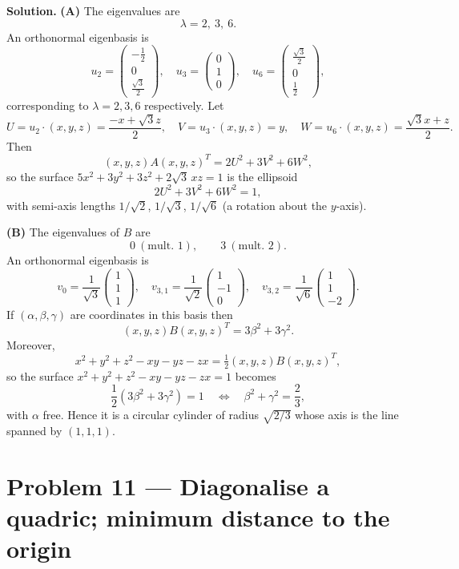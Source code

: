 \documentclass[12pt,a4paper]{article}
\theoremstyle{plain}
\theoremstyle{definition}      %
\begin{document}
\textbf{Solution.}
\textbf{(A)} The eigenvalues are
\[
\lambda=2,\ 3,\ 6.
\]
An orthonormal eigenbasis is
\[
u_{2}=\begin{pmatrix}-\tfrac12\\[2pt]0\\[2pt]\tfrac{\sqrt3}{2}\end{pmatrix},\quad
u_{3}=\begin{pmatrix}0\\[2pt]1\\[2pt]0\end{pmatrix},\quad
u_{6}=\begin{pmatrix}\tfrac{\sqrt3}{2}\\[2pt]0\\[2pt]\tfrac12\end{pmatrix},
\]
corresponding to $\lambda=2,3,6$ respectively.
Let
\[
U=u_2\cdot(x,y,z)=\frac{-x+\sqrt3 z}{2},\quad
V=u_3\cdot(x,y,z)=y,\quad
W=u_6\cdot(x,y,z)=\frac{\sqrt3 x+z}{2}.
\]
Then
\[
(x,y,z)A(x,y,z)^T=2U^2+3V^2+6W^2,
\]
so the surface $5x^2+3y^2+3z^2+2\sqrt3\,xz=1$ is the ellipsoid
\[
2U^2+3V^2+6W^2=1,
\]
with semi-axis lengths $1/\sqrt2$, $1/\sqrt3$, $1/\sqrt6$ (a rotation about the $y$-axis).

\textbf{(B)} The eigenvalues of $B$ are
\[
0\ (\text{mult.\ }1),\qquad 3\ (\text{mult.\ }2).
\]
An orthonormal eigenbasis is
\[
v_0=\frac1{\sqrt3}\begin{pmatrix}1\\1\\1\end{pmatrix},\quad
v_{3,1}=\frac1{\sqrt2}\begin{pmatrix}1\\-1\\0\end{pmatrix},\quad
v_{3,2}=\frac1{\sqrt6}\begin{pmatrix}1\\1\\-2\end{pmatrix}.
\]
If $(\alpha,\beta,\gamma)$ are coordinates in this basis then
\[
(x,y,z)B(x,y,z)^T=3\beta^2+3\gamma^2.
\]
Moreover,
\[
x^2+y^2+z^2-xy-yz-zx=\tfrac12(x,y,z)B(x,y,z)^T,
\]
so the surface $x^2+y^2+z^2-xy-yz-zx=1$ becomes
\[
\frac12(3\beta^2+3\gamma^2)=1
\quad\Longleftrightarrow\quad
\beta^2+\gamma^2=\frac23,
\]
with $\alpha$ free. Hence it is a circular cylinder of radius $\sqrt{2/3}$ whose axis is the line spanned by $(1,1,1)$.

\section*{Problem 11 — Diagonalise a quadric; minimum distance to the origin}
\end{document}
